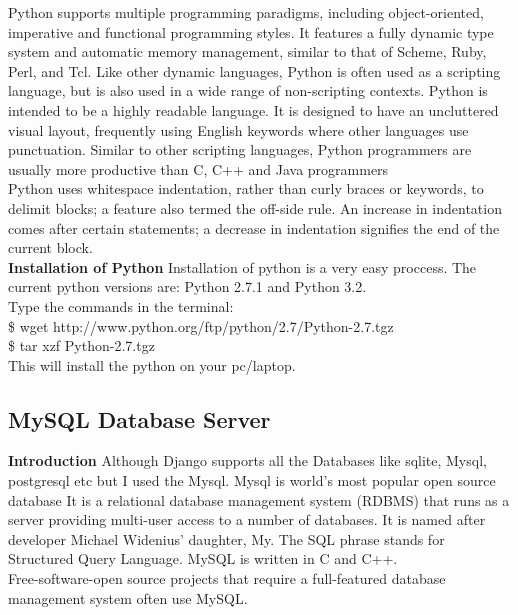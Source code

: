 Python supports multiple programming paradigms, including object-oriented, imperative and functional programming styles. It features a fully dynamic type system and automatic memory management, similar to that of Scheme, Ruby, Perl, and Tcl. Like other dynamic languages, Python is often used as a scripting language, but is also used in a wide range of non-scripting contexts. Python is intended to be a highly readable language. It is designed to have an uncluttered visual layout, frequently using English keywords where other languages use punctuation. Similar to other scripting languages, Python programmers are usually more productive than C, C++ and Java programmers\\

Python uses whitespace indentation, rather than curly braces or keywords, to delimit blocks; a feature also termed the off-side rule. An increase in indentation comes after certain statements; a decrease in indentation signifies the end of the current block.\\

{ \bf Installation of Python}
Installation of python is a very easy proccess.
The current python versions are: Python 2.7.1 and Python 3.2.\\


Type the commands in the terminal:\\

 \$ wget http://www.python.org/ftp/python/2.7/Python-2.7.tgz\\

 
 \$ tar xzf Python-2.7.tgz\\


This will install the python on your pc/laptop.

\newpage

\subsection{MySQL Database Server}

{\bf Introduction} Although Django supports all the Databases like sqlite, Mysql, postgresql etc but I used the Mysql. Mysql is world’s most popular open source database It is a relational database management system (RDBMS) that runs as a server providing multi-user access to a number of databases. It is named after developer Michael Widenius’ daughter, My. The SQL phrase stands for
Structured Query Language. MySQL is written in C and C++.\\
         Free-software-open source projects that require a full-featured database management system
often use MySQL.\\

